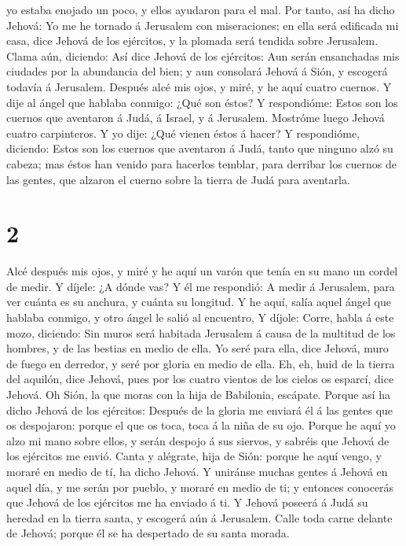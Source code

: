 yo estaba enojado un poco, y ellos ayudaron para el mal. 
Por tanto, así ha dicho Jehová: Yo me he tornado á Jerusalem con
miseraciones; en ella será edificada mi casa, dice Jehová de los
ejércitos, y la plomada será tendida sobre Jerusalem. 
Clama aún, diciendo: Así dice Jehová de los ejércitos: Aun serán
ensanchadas mis ciudades por la abundancia del bien; y aun consolará
Jehová á Sión, y escogerá todavía á Jerusalem.  Después
alcé mis ojos, y miré, y he aquí cuatro cuernos.  Y dije al
ángel que hablaba conmigo: ¿Qué son éstos? Y respondióme: Estos son los
cuernos que aventaron á Judá, á Israel, y á Jerusalem. 
Mostróme luego Jehová cuatro carpinteros.  Y yo dije: ¿Qué
vienen éstos á hacer? Y respondióme, diciendo: Estos son los cuernos que
aventaron á Judá, tanto que ninguno alzó su cabeza; mas éstos han venido
para hacerlos temblar, para derribar los cuernos de las gentes, que
alzaron el cuerno sobre la tierra de Judá para aventarla.

\hypertarget{section-1}{%
\section{2}\label{section-1}}

 Alcé después mis ojos, y miré y he aquí un varón que tenía
en su mano un cordel de medir.  Y díjele: ¿A dónde vas? Y él
me respondió: A medir á Jerusalem, para ver cuánta es su anchura, y
cuánta su longitud.  Y he aquí, salía aquel ángel que
hablaba conmigo, y otro ángel le salió al encuentro,  Y
díjole: Corre, habla á este mozo, diciendo: Sin muros será habitada
Jerusalem á causa de la multitud de los hombres, y de las bestias en
medio de ella.  Yo seré para ella, dice Jehová, muro de
fuego en derredor, y seré por gloria en medio de ella.  Eh,
eh, huid de la tierra del aquilón, dice Jehová, pues por los cuatro
vientos de los cielos os esparcí, dice Jehová.  Oh Sión, la
que moras con la hija de Babilonia, escápate.  Porque así ha
dicho Jehová de los ejércitos: Después de la gloria me enviará él á las
gentes que os despojaron: porque el que os toca, toca á la niña de su
ojo.  Porque he aquí yo alzo mi mano sobre ellos, y serán
despojo á sus siervos, y sabréis que Jehová de los ejércitos me envió.
 Canta y alégrate, hija de Sión: porque he aquí vengo, y
moraré en medio de tí, ha dicho Jehová.  Y uniránse muchas
gentes á Jehová en aquel día, y me serán por pueblo, y moraré en medio
de ti; y entonces conocerás que Jehová de los ejércitos me ha enviado á
ti.  Y Jehová poseerá á Judá su heredad en la tierra santa,
y escogerá aún á Jerusalem.  Calle toda carne delante de
Jehová; porque él se ha despertado de su santa morada.

